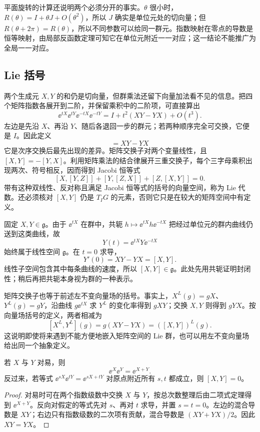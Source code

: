 平面旋转的计算还说明两个必须分开的事实。$\theta$ 很小时，$R(\theta)=I+\theta J+O(\theta^2)$，所以 $J$ 确实是单位元处的切向量；但 $R(\theta+2\pi)=R(\theta)$，所以不同参数可以给同一群元。指数映射在零点的导数是恒等映射，由局部反函数定理可知它在单位元附近一一对应；这一结论不能推广为全局一一对应。

\subsection{Lie 括号}

两个生成元 $X,Y$ 的和仍是切向量，但群乘法还留下向量加法看不见的信息。把四个矩阵指数各展开到二阶，并保留乘积中的二阶项，可直接算出
\[
\ee^{tX}\ee^{tY}\ee^{-tX}\ee^{-tY}
=I+t^2(XY-YX)+O(t^3).
\]
左边是先沿 $X$、再沿 $Y$、随后各退回一步的群元；若两种顺序完全可交换，它便是 $I$。因此定义
\begin{equation}
[X,Y]=XY-YX
\label{eq:matrix-lie-bracket}
\end{equation}
它是次序交换后最先出现的差异。矩阵交换子对两个变量线性，且 $[X,Y]=-[Y,X]$。利用矩阵乘法的结合律展开三重交换子，每个三字母乘积出现两次、符号相反，因而得到 Jacobi 恒等式
\[
[X,[Y,Z]]+[Y,[Z,X]]+[Z,[X,Y]]=0.
\]
带有这种双线性、反对称且满足 Jacobi 恒等式的括号的向量空间，称为 Lie 代数。还必须核对 $[X,Y]$ 仍是 $T_IG$ 的元素，否则它只是在较大的矩阵空间中有定义。

固定 $X,Y\in\mathfrak g$。由于 $\ee^{tX}$ 在群中，共轭 $h\mapsto\ee^{tX}h\ee^{-tX}$ 把经过单位元的群内曲线仍送到这类曲线，故
\[
Y(t)=\ee^{tX}Y\ee^{-tX}
\]
始终属于线性空间 $\mathfrak g$。在 $t=0$ 求导，
\[
Y'(0)=XY-YX=[X,Y].
\]
线性子空间包含其中每条曲线的速度，所以 $[X,Y]\in\mathfrak g$。此处先用共轭证明封闭性；稍后再把共轭本身视为群的一种表示。

矩阵交换子也等于前述左不变向量场的括号。事实上，$X^L(g)=gX$、$Y^L(g)=gY$，沿曲线 $g\ee^{tX}$ 求 $Y^L$ 的变化率得到 $gXY$；交换 $X,Y$ 则得到 $gYX$。按向量场括号的定义，两者相减为
\[
[X^L,Y^L](g)=g(XY-YX)=([X,Y])^L(g).
\]
这说明即使将来遇到不能方便地嵌入矩阵空间的 Lie 群，也可以用左不变向量场给出同一个抽象定义。

\begin{proposition}[两个指数何时可以直接合并]
若 $X$ 与 $Y$ 对易，则
\[
\ee^X\ee^Y=\ee^{X+Y}.
\]
反过来，若等式 $\ee^{sX}\ee^{tY}=\ee^{sX+tY}$ 对原点附近所有 $s,t$ 都成立，则 $[X,Y]=0$。
\end{proposition}

\begin{proof}
对易时可在两个指数级数中交换 $X$ 与 $Y$，按总次数整理后由二项式定理得到 $\ee^{X+Y}$。反向对假定的等式先对 $s$、再对 $t$ 求导，并置 $s=t=0$。左边的混合导数是 $XY$；右边只有指数级数的二次项有贡献，混合导数是 $(XY+YX)/2$。因此 $XY=YX$。
\end{proof}

